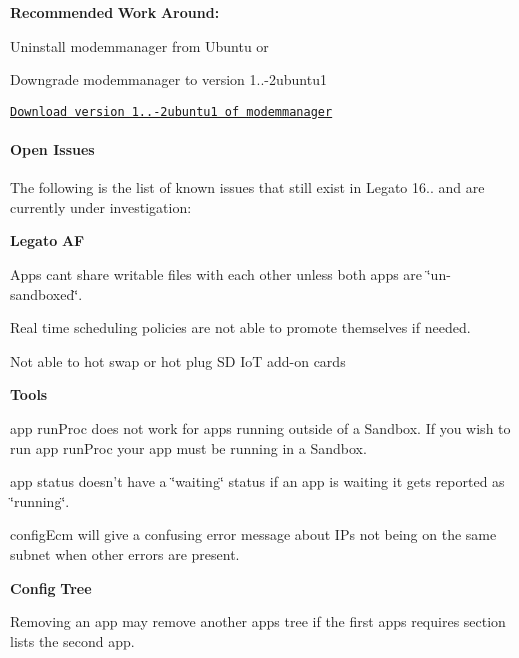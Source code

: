 {\bfseries Recommended} {\bfseries Work} {\bfseries Around\+:} 
\begin{DoxyItemize}
\item Uninstall {\ttfamily modemmanager} from Ubuntu or
\item Downgrade {\ttfamily modemmanager} to version 1..-\/2ubuntu1
\end{DoxyItemize}

\href{http://packages.ubuntu.com/trusty/modemmanager}{\tt Download version 1..-\/2ubuntu1 of modemmanager}\hypertarget{releaseNotes16104_rn16_10_4_OpenIssues}{}\paragraph{Open Issues}\label{releaseNotes16104_rn16_10_4_OpenIssues}
The following is the list of known issues that still exist in Legato 16.. and are currently under investigation\+:

{\bfseries Legato} {\bfseries AF} 
\begin{DoxyItemize}
\item Apps can\textquotesingle{}t share writable files with each other unless both apps are \char`\"{}un-\/sandboxed\char`\"{}.
\item Real time scheduling policies are not able to promote themselves if needed.
\item Not able to hot swap or hot plug SD IoT add-\/on cards
\end{DoxyItemize}

{\bfseries Tools} 
\begin{DoxyItemize}
\item {\ttfamily app} {\ttfamily run\+Proc} does not work for apps running outside of a Sandbox. If you wish to run {\ttfamily app} run\+Proc your {\ttfamily app} must be running in a Sandbox.
\item {\ttfamily app} {\ttfamily status} doesn’t have a \char`\"{}waiting\char`\"{} status if an app is waiting it gets reported as \char`\"{}running\char`\"{}.
\item {\ttfamily config\+Ecm} will give a confusing error message about IP\textquotesingle{}s not being on the same subnet when other errors are present.
\end{DoxyItemize}

{\bfseries Config} {\bfseries Tree} 
\begin{DoxyItemize}
\item Removing an {\ttfamily app} may remove another {\ttfamily apps} tree if the first {\ttfamily apps} requires section lists the second {\ttfamily app}.
\end{DoxyItemize}

